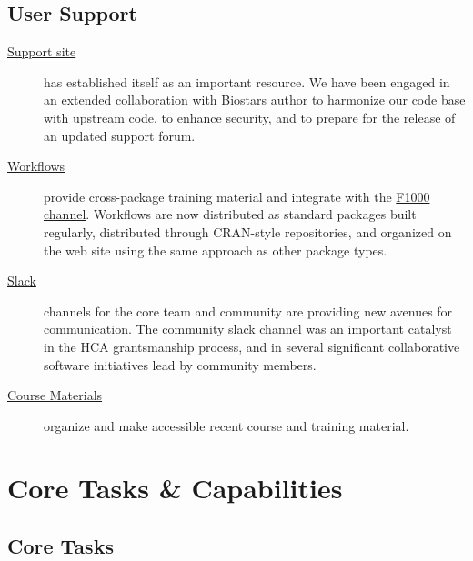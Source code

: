 \documentclass[letterpaper]{article}
\begin{document}
\subsection{User Support}

\begin{description}
\item[\href{https://support.bioconductor.org}{Support site}] has
  established itself as an important resource. We have been engaged in
  an extended collaboration with Biostars author to harmonize our code
  base with upstream code, to enhance security, and to prepare for the
  release of an updated support forum.
\item[\href{https://bioconductor.org/help/workflows}{Workflows}]
  provide cross-package training material and integrate with the
  \href{http://f1000research.com/channels/bioconductor}{F1000
    \Bioconductor{} channel}. Workflows are now distributed as
  standard \R{} packages built regularly, distributed through
  CRAN-style repositories, and organized on the web site using the
  same approach as other package types.
\item[\href{https://community-bioc.slack.com}{Slack}] channels for the
  core team and \Bioconductor{} community are providing new avenues
  for communication. The community slack channel was an important
  catalyst in the HCA grantsmanship process, and in several
  significant collaborative software initiatives lead by community
  members.
\item[\href{https://bioconductor.org/help/course-materials}{Course
    Materials}] organize and make accessible recent course and
  training material.
\end{description}

\section{Core Tasks \& Capabilities}

\subsection{Core Tasks}
\end{document}
